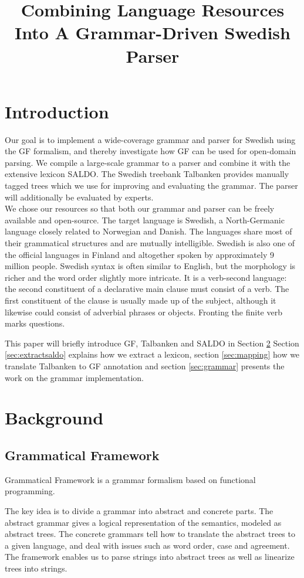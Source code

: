 \documentclass[10pt, a4paper]{article}
\title{Combining Language Resources Into A Grammar-Driven Swedish Parser}
\begin{document}
\maketitleabstract


\section{Introduction}
Our goal is to implement a wide-coverage grammar and parser for Swedish
using the GF formalism, and 
thereby investigate how GF can be used for open-domain parsing.
We compile a large-scale grammar to a parser
and combine it with the extensive lexicon SALDO. The Swedish treebank 
Talbanken provides manually tagged trees which we use for improving and evaluating
the grammar. The parser will additionally
be evaluated by experts. \\
We chose our resources so that both our grammar and parser can 
be freely available and open-source. 
The target language is Swedish, a North-Germanic language
closely related to Norwegian and Danish. The languages share most of their
grammatical structures and are mutually intelligible. Swedish is also 
one of the official languages in Finland and altogether spoken by approximately 9
million people.
Swedish syntax is often similar to English, but the  morphology is richer and the
word order slightly more intricate.
It is a verb-second language: the second constituent of a declarative main
clause must consist of a verb.
The first constituent of the clause is usually made up of the subject,
although it likewise could consist of adverbial phrases or objects.
Fronting the finite verb marks questions.

This paper will briefly introduce GF, Talbanken and SALDO in Section \ref{sec:background}
Section \ref{sec:extractsaldo} explains how we extract a lexicon, section \ref{sec:mapping}
how we translate Talbanken to GF annotation and section \ref{sec:grammar}
presents the work on the grammar implementation.


\section{Background}
\label{sec:background}
\subsection{Grammatical Framework}
\label{sec:gf}


Grammatical Framework \cite{ranta-2011} is a grammar formalism based on
functional programming. 

The key idea is to divide a grammar into abstract and concrete parts. 
The abstract grammar gives a logical representation of the semantics,
modeled as abstract trees.
The concrete grammars tell how to translate the abstract trees to a given language,
and deal with issues such as word order, case and agreement. 
The framework enables us to parse strings into abstract trees as well as
linearize trees into strings.
\end{document}
